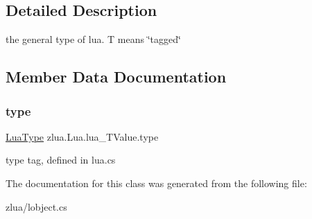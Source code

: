 \subsection{Detailed Description}
the general type of lua. T means \char`\"{}tagged\char`\"{} 



\subsection{Member Data Documentation}
\mbox{\label{classzlua_1_1_lua_1_1lua___t_value_ae44cefc1298fe699be09c2ba73ef92a5}} 
\subsubsection{\texorpdfstring{type}{type}}
{\footnotesize\ttfamily \mbox{\hyperlink{classzlua_1_1_lua_a3bea46ecc2aabf23ac160bd7e7172e70}{Lua\+Type}} zlua.\+Lua.\+lua\+\_\+\+T\+Value.\+type}



type tag, defined in lua.\+cs 



The documentation for this class was generated from the following file\+:\begin{DoxyCompactItemize}
\item 
zlua/lobject.\+cs\end{DoxyCompactItemize}
